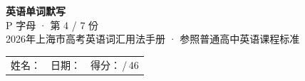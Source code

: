 \documentclass[10pt,a4paper]{article}
\begin{document}
\pagestyle{plain}

\begin{center}
{\LARGE\bfseries 英语单词默写}\\[0.22em]
{\large P 字母 · 第 4 / 7 份}\\[0.18em]
{\small 2026年上海市高考英语词汇用法手册 · 参照普通高中英语课程标准}
\end{center}

\vspace{0.25em}
\noindent\begin{tabular}{@{}p{}@{}p{}@{}p{}@{}}
姓名：\underline{\hspace{2.0cm}} & 日期：\underline{\hspace{2.0cm}} & 得分：\underline{\hspace{1.3cm}}\,/\,46 \\
\end{tabular}

\vspace{0.3em}

\vspace{0.08em}
\end{document}

